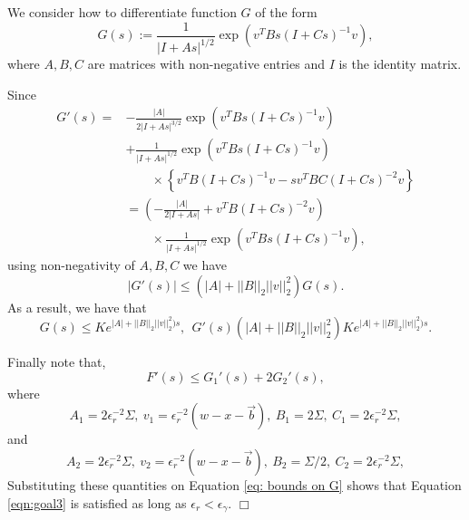 \documentclass[12pt]{article}
\newenvironment {proof}{{\noindent\bf Proof }}{\hfill $\Box$ \medskip}
\newcommand{\meanq}{\vec b}    %
\newcommand{\covq}{\Sigma}     %
\begin{document}
\begin{proof}
We consider how to differentiate function $G$ of the form 
$$G(s):=\frac{1}{|I+As|^{1/2}}\exp(v^{T}Bs(I+Cs)^{-1}v),$$
where $A,B,C$ are matrices with non-negative entries and $I$ is the identity matrix.

Since 
\begin{equation}
\begin{aligned}
G'(s)=& - \frac{|A|}{2|I+As|^{3/2}}\exp(v^{T}Bs(I+Cs)^{-1}v)\\
      & + \frac{1}{|I+As|^{1/2}}\exp(v^{T}Bs(I+Cs)^{-1}v)\\
      & \qquad \times \left\{ v^{T}B(I+Cs)^{-1}v
                            - sv^{T}BC(I+Cs)^{-2}v
                    \right\}\\
      &=\left(- \frac{|A|}{2|I+As|}+v^{T}B(I+Cs)^{-2}v
        \right)\\
      & \qquad \times
        \frac{1}{|I+As|^{1/2}}\exp(v^{T}Bs(I+Cs)^{-1}v),
\end{aligned}
\end{equation}
using non-negativity of $A,B,C$ we have
\begin{equation}
\label{eq: bounds on G'}
|G'(s)| \leq (|A|+||B||_{2}||v||_2^2)G(s).    
\end{equation}
As a result, we have that 
\begin{equation}
\label{eq: bounds on G}
G(s) \leq K e^{|A|+||B||_{2}||v||_2^2)s}, ~~   G'(s)(|A|+||B||_{2}||v||_2^2)K e^{|A|+||B||_{2}||v||_2^2)s}.  
\end{equation}

Finally note that, 
$$F'(s) \leq G_1'(s)+2G_2'(s),$$
where 
$$A_1= 2\epsilon_r^{-2} \covq, ~ v_1=\epsilon_r^{-2}(w-x-\meanq), ~B_1 = 2\covq, ~C_1=2\epsilon_r^{-2} \covq,$$
and 
$$A_2= 2\epsilon_r^{-2} \covq, ~ v_2=\epsilon_r^{-2}(w-x-\meanq), ~B_2 = \covq/2, ~C_2=2\epsilon_r^{-2} \covq,$$
Substituting these quantities on Equation \eqref{eq: bounds on G} shows that Equation \eqref{eqn:goal3} is satisfied as long as $\epsilon_r < \epsilon_\gamma$.
\end{proof}
\end{document}
